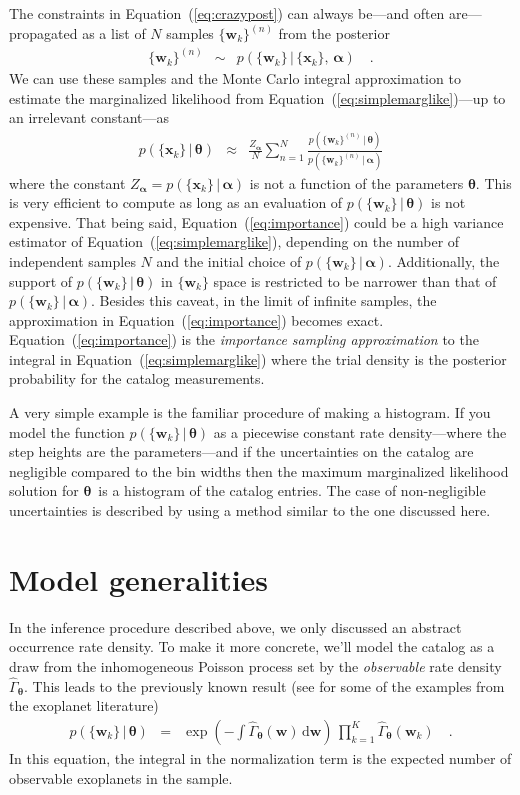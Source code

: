 \documentclass[12pt,preprint]{aastex}
\newcommand{\Eq}[1]{Equation~(\ref{eq:#1})}
\newcommand{\eq}[1]{\Eq{#1}}
\newcommand{\eqlabel}[1]{\label{eq:#1}}
\newcommand{\sectlabel}[1]{\label{sect:#1}}
\newcommand{\dd}{\ensuremath{\,\mathrm{d}}}
\newcommand{\bvec}[1]{\ensuremath{\boldsymbol{#1}}}
\newcommand{\rate}{\ensuremath{\Gamma}}
\newcommand{\ratepar}{{\ensuremath{\theta}}}
\newcommand{\ratepars}{{\ensuremath{\bvec{\ratepar}}}}
\newcommand{\obs}[1]{\ensuremath{\hat{#1}}}
\newcommand{\data}{{\ensuremath{\bvec{x}}}}
\newcommand{\entry}{{\ensuremath{\bvec{w}}}}
\newcommand{\interim}{{\ensuremath{\bvec{\alpha}}}}
\begin{document}
The constraints in \eq{crazypost} can always be---and often are---propagated
as a list of $N$ samples $\{\entry_k\}^{(n)}$ from the posterior
\begin{eqnarray}\eqlabel{samples}
\{\entry_k\}^{(n)} &\sim& p(\{\entry_k\}\,|\,\{\data_k\},\,\interim) \quad.
\end{eqnarray}
We can use these samples and the Monte Carlo integral approximation to
estimate the marginalized likelihood from \eq{simplemarglike}---up to an
irrelevant constant---as
\begin{eqnarray}\eqlabel{importance}
p(\{\data_k\}\,|\,\ratepars) &\approx&
    \frac{Z_\interim}{N} \sum_{n=1}^N
    \frac{p(\{\entry_k\}^{(n)}\,|\,\ratepars)}
         {p(\{\entry_k\}^{(n)}\,|\,\interim)}
\end{eqnarray}
where the constant $Z_\interim = p(\{\data_k\}\,|\,\interim)$ is not a
function of the parameters \ratepars.
This is very efficient to compute as long as an evaluation of
$p(\{\entry_k\}\,|\,\ratepars)$ is not expensive.
That being said, \eq{importance} could be a high variance estimator of
\eq{simplemarglike}, depending on the number of independent samples $N$ and
the initial choice of $p(\{\entry_k\}\,|\,\interim)$.
Additionally, the support of $p(\{\entry_k\}\,|\,\ratepars)$ in $\{\entry_k\}$
space is restricted to be narrower than that of
$p(\{\entry_k\}\,|\,\interim)$.
Besides this caveat, in the limit of infinite samples, the approximation in
\eq{importance} becomes exact.
\Eq{importance} is the \emph{importance sampling approximation} to the
integral in \eq{simplemarglike} where the trial density is the posterior
probability for the catalog measurements.

A very simple example is the familiar procedure of making a histogram.
If you model the function $p(\{\entry_k\}\,|\,\ratepars)$ as a piecewise
constant rate density---where the step heights are the parameters---and if the
uncertainties on the catalog are negligible compared to the bin widths then
the maximum marginalized likelihood solution for \ratepars\ is a histogram of
the catalog entries.
The case of non-negligible uncertainties is described by \citet{hogge} using a
method similar to the one discussed here.

\section{Model generalities}
\sectlabel{model}

In the inference procedure described above, we only discussed an abstract
occurrence rate density.
To make it more concrete, we'll model the catalog as a draw from the
inhomogeneous Poisson process set by the \emph{observable} rate density
$\obs{\rate}_\ratepars$.
This leads to the previously known result (see \citealt{tabachnik,youdin} for
some of the examples from the exoplanet literature)
\begin{eqnarray}\eqlabel{poisson-like}
p(\{\entry_k\}\,|\,\ratepars) &=&
    \exp\left(-\int \obs{\rate}_\ratepars (\entry) \dd\entry\right) \,
    \prod_{k=1}^K \obs{\rate}_\ratepars (\entry_k)\quad.
\end{eqnarray}
In this equation, the integral in the normalization term is the expected
number of observable exoplanets in the sample.
\end{document}
